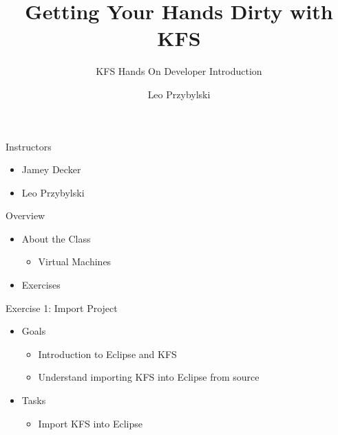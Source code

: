 \documentclass[xcolor=dvipsnames,14pt]{beamer}
\begin{document}
\title[A short proof]{Getting Your Hands Dirty with KFS}
\subtitle[Errors]{KFS Hands On Developer Introduction}
\author[Leo]{Leo Przybylski}



\begin{frame}[plain]
  \titlepage
\end{frame}

\begin{frame}{Instructors}
	\begin{itemize}
		\item Jamey Decker
		\item Leo Przybylski
	\end{itemize}
\end{frame}

\begin{frame}{Overview}
	\begin{itemize}
		\item About the Class
		\begin{itemize}
			\item Virtual Machines
		\end{itemize}
        \item Exercises
	\end{itemize}
\end{frame}

\begin{frame}[fragile]{Exercise 1: Import Project}
	\begin{itemize}
		\item Goals
          \begin{itemize}
            \item Introduction to Eclipse and KFS
            \item Understand importing KFS into Eclipse from source
          \end{itemize}          
		\item Tasks
          \begin{itemize}
            \item Import KFS into Eclipse
          \end{itemize}          
	\end{itemize}

\end{frame}
\end{document}
